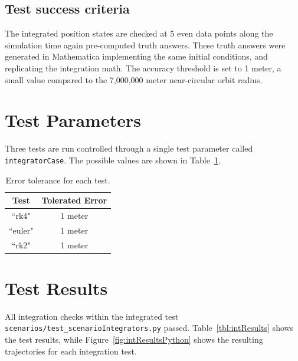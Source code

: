 \subsection{Test success criteria}
The integrated position states are checked at 5 even data points along the simulation time again pre-computed truth answers.  These truth answers were generated in Mathematica implementing the same initial conditions, and replicating the integration math.    The accuracy threshold is set to 1 meter, a small value compared to the 7,000,000 meter near-circular orbit radius.



\section{Test Parameters}
Three tests are run controlled through a single test parameter called {\tt integratorCase}.  The possible values are shown in Table~\ref{tbl:intCases}.

\begin{table}[htbp]
	\caption{Error tolerance for each test.}
	\label{tbl:intCases}
	\centering \fontsize{10}{10}\selectfont
	\begin{tabular}{ c | c } %
		\hline\hline
		\textbf{Test}   	      	               & \textbf{Tolerated Error} 						           \\ \hline
		``rk4"                           & 1 meter	  \\
		``euler"                           & 1 meter	  \\
		``rk2"                           & 1 meter	  \\
		\hline\hline
	\end{tabular}
\end{table}

\section{Test Results}
All integration checks within the integrated test {\tt scenarios/test\_scenarioIntegrators.py} passed.  Table~\ref{tbl:intResults} shows the test results, while Figure~\ref{fig:intResultsPython} shows the resulting trajectories for each integration test.




